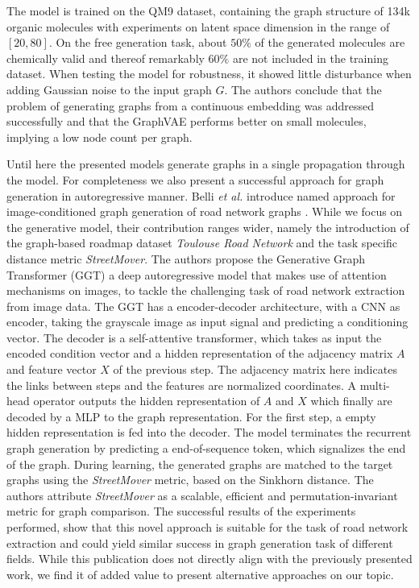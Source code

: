 The model is trained on the QM9 dataset, containing the graph structure of 134k organic molecules with experiments on latent space dimension in the range of $[20,80]$. On the free generation task, about $50\%$ of the generated molecules are chemically valid and thereof remarkably $60\%$ are not included in the training dataset. When testing the model for robustness, it showed little disturbance when adding Gaussian noise to the input graph $G$. The authors conclude that the problem of generating graphs
from a continuous embedding was addressed successfully and that the GraphVAE performs better on small molecules, implying a low node count per graph.


Until here the presented models generate graphs in a single propagation through the model. For completeness we also present a successful approach for graph generation in autoregressive manner. Belli \textit{et al.} introduce named approach for image-conditioned graph generation of road network graphs \cite{belli_image-conditioned_2019}. While we focus on the generative model, their contribution ranges wider, namely the introduction of the graph-based roadmap dataset \textit{Toulouse Road Network} and the task specific distance metric \textit{StreetMover}. The authors propose the Generative Graph Transformer (GGT) a deep autoregressive model that makes use of attention mechanisms on images, to tackle the challenging task of road network extraction from image data. The GGT has a encoder-decoder architecture, with a CNN as encoder, taking the grayscale image as input signal and predicting a conditioning vector. The decoder is a self-attentive transformer, which takes as input the encoded condition vector and a hidden representation of the adjacency matrix $A$ and feature vector $X$ of the previous step. The adjacency matrix here indicates the links between steps and the features are normalized coordinates. A multi-head operator outputs the hidden representation of $A$ and $X$ which finally are decoded by a MLP to the graph representation. For the first step, a empty hidden representation is fed into the decoder. The model terminates the recurrent graph generation by predicting a end-of-sequence token, which signalizes the end of the graph. During learning, the generated graphs are matched to the target graphs using the \textit{StreetMover} metric, based on the Sinkhorn distance. The authors attribute \textit{StreetMover} as a scalable, efficient and permutation-invariant metric for graph comparison. The successful results of the experiments performed, show that this novel approach is suitable for the task of road network extraction and could yield similar success in graph generation task of different fields.
While this publication does not directly align with the previously presented work, we find it of added value to present alternative approaches on our topic.

